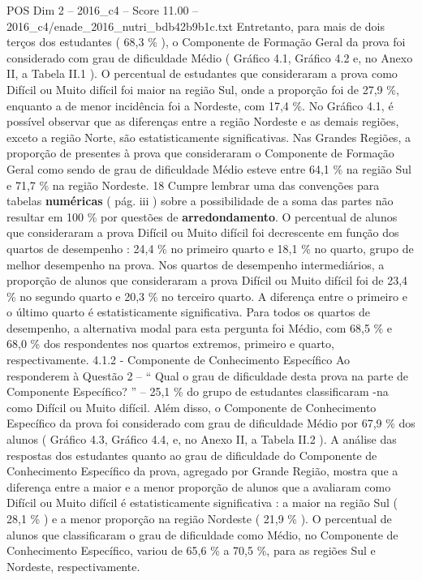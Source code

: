 \begin{textsample}{POS Dim 2 – 2016\_c4 – Score 11.00 – 2016\_c4/enade\_2016\_nutri\_bdb42b9b1c.txt}
Entretanto, para mais de dois terços dos estudantes ( 68,3 \% ), o Componente de Formação Geral da prova foi considerado com grau de dificuldade Médio ( Gráfico 4.1, Gráfico 4.2 e, no Anexo II, a Tabela II.1 ).
O percentual de estudantes que consideraram a prova como Difícil ou Muito difícil foi maior na região Sul, onde a proporção foi de 27,9 \%, enquanto a de menor incidência foi a Nordeste, com 17,4 \%.
No Gráfico 4.1, é possível observar que as diferenças entre a região Nordeste e as demais regiões, exceto a região Norte, são estatisticamente significativas.
Nas Grandes Regiões, a proporção de presentes à prova que consideraram o Componente de Formação Geral como sendo de grau de dificuldade Médio esteve entre 64,1 \% na região Sul e 71,7 \% na região Nordeste. 18 Cumpre lembrar uma das convenções para tabelas \textbf{numéricas} ( pág. iii ) sobre a possibilidade de a soma das partes não resultar em 100 \% por questões de \textbf{arredondamento}.
O percentual de alunos que consideraram a prova Difícil ou Muito difícil foi decrescente em função dos quartos de desempenho : 24,4 \% no primeiro quarto e 18,1 \% no quarto, grupo de melhor desempenho na prova.
Nos quartos de desempenho intermediários, a proporção de alunos que consideraram a prova Difícil ou Muito difícil foi de 23,4 \% no segundo quarto e 20,3 \% no terceiro quarto.
A diferença entre o primeiro e o último quarto é estatisticamente significativa.
Para todos os quartos de desempenho, a alternativa modal para esta pergunta foi Médio, com 68,5 \% e 68,0 \% dos respondentes nos quartos extremos, primeiro e quarto, respectivamente. 4.1.2 - Componente de Conhecimento Específico Ao responderem à Questão 2 – “ Qual o grau de dificuldade desta prova na parte de Componente Específico? ” – 25,1 \% do grupo de estudantes classificaram -na como Difícil ou Muito difícil.
Além disso, o Componente de Conhecimento Específico da prova foi considerado com grau de dificuldade Médio por 67,9 \% dos alunos ( Gráfico 4.3, Gráfico 4.4, e, no Anexo II, a Tabela II.2 ).
A análise das respostas dos estudantes quanto ao grau de dificuldade do Componente de Conhecimento Específico da prova, agregado por Grande Região, mostra que a diferença entre a maior e a menor proporção de alunos que a avaliaram como Difícil ou Muito difícil é estatisticamente significativa : a maior na região Sul ( 28,1 \% ) e a menor proporção na região Nordeste ( 21,9 \% ).
O percentual de alunos que classificaram o grau de dificuldade como Médio, no Componente de Conhecimento Específico, variou de 65,6 \% a 70,5 \%, para as regiões Sul e Nordeste, respectivamente.

\end{textsample}
